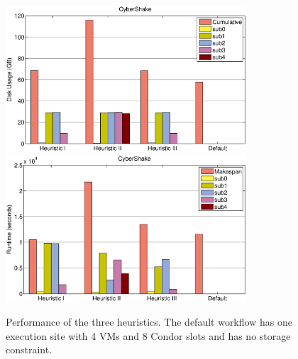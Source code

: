 \begin{figure}[h!]
	\centering
    \includegraphics[width=0.8\textwidth]{figures/partitioning/heuristics_usage.eps}
\includegraphics[width=0.8\textwidth]{figures/partitioning/heuristics_makespan.eps}
    \caption{Performance of the three heuristics. The default workflow has one execution site with 4 VMs and 8 Condor slots and has no storage constraint.}
    \label{fig:heuristics}
\end{figure}








